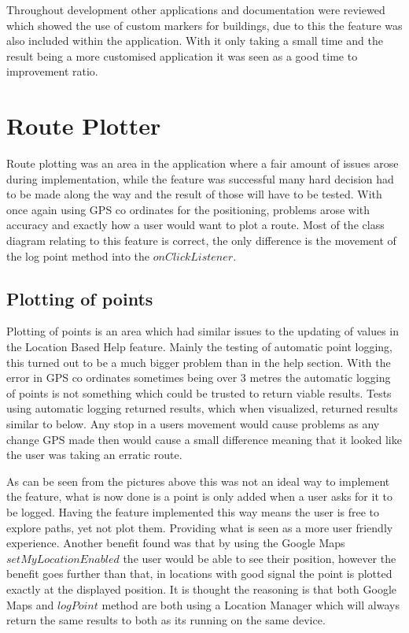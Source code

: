 Throughout development other applications and documentation were reviewed which showed the use of custom markers for buildings, due to this the feature was also included within the application. With it only taking a small time and the result being a more customised application it was seen as a good time to improvement ratio. 

\section{Route Plotter}
Route plotting was an area in the application where a fair amount of issues arose during implementation, while the feature was successful many hard decision had to be made along the way and the result of those will have to be tested. With once again using GPS co ordinates for the positioning, problems arose with accuracy and exactly how a user would want to plot a route. Most of the class diagram relating to this feature is correct, the only difference is the movement of the log point method into the $onClickListener$.
\subsection{Plotting of points}
Plotting of points is an area which had similar issues to the updating of values in the Location Based Help feature. Mainly the testing of automatic point logging, this turned out to be a much bigger problem than in the help section. With the error in GPS co ordinates sometimes being over 3 metres\cite{gps} the automatic logging of points is not something which could be trusted to return viable results. Tests using automatic logging returned results, which when visualized, returned results similar to below. Any stop in a users movement would cause problems as any change GPS made then would cause a small difference meaning that it looked like the user was taking an erratic route.

As can be seen from the pictures above this was not an ideal way to implement the feature, what is now done is a point is only added when a user asks for it to be logged. Having the feature implemented this way means the user is free to explore paths, yet not plot them. Providing what is seen as a more user friendly experience. Another benefit found was that by using the Google Maps $setMyLocationEnabled$\cite{setlocation} the user would be able to see their position, however the benefit goes further than that, in locations with good signal the point is plotted exactly at the displayed position. It is thought the reasoning is that both Google Maps and $logPoint$ method are both using a Location Manager which will always return the same results to both as its running on the same device.
